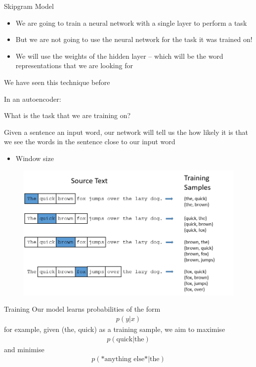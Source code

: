 \documentclass{beamer}
\begin{document}
	\begin{frame}[allowframebreaks]{Skipgram Model}
		\begin{itemize}
			\item We are going to train a neural network with a single layer to perform a task
			\item But we are not going to use the neural network for the task it was trained on!
			\item We will use the weights of the hidden layer -- which will be the word representations that we are looking for
		\end{itemize}
		
		\pagebreak
		
		We have seen this technique before
		
		In an autoencoder:
		
		
		\pagebreak
		
		What is the task that we are training on?
		
		Given a sentence an input word, our network will tell us the how likely it is that we see the words in the sentence close to our input word
		
		\begin{itemize}
			\item Window size
		\end{itemize}
		
		\begin{figure}
			\centering
			\includegraphics[width=\textwidth]{presentation_5_figures/training_data}
		\end{figure}
		
	\end{frame}
	
	\begin{frame}{Training}
		Our model learns probabilities of the form
		\begin{align*}
		p(y | x)
		\end{align*}
		for example, given (the, quick) as a training sample, we aim to maximise
		\begin{align*}
		p(\text{quick} | \text{the})
		\end{align*}
		and minimise
		\begin{align*}
		p(\text{*anything else*} | \text{the})
		\end{align*}
	\end{frame}
	
\end{document}
